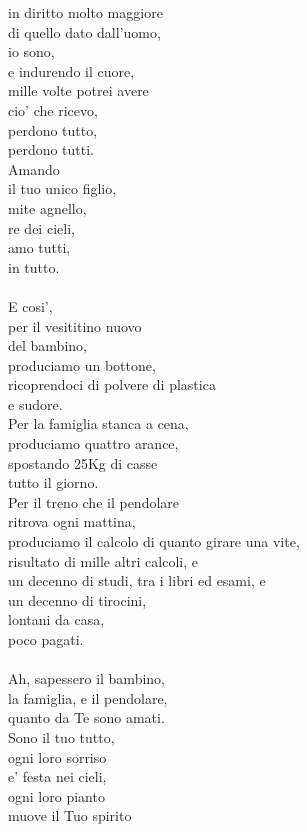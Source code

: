 \begin{haiku}
in diritto molto maggiore\\
di quello dato dall'uomo,\\
io sono,\\
e indurendo il cuore,\\
mille volte potrei avere\\
cio' che ricevo,\\
perdono tutto,\\
perdono tutti.\\
Amando \\
il tuo unico figlio,\\
mite agnello,\\
re dei cieli,\\
amo tutti,\\
in tutto.\\
\leavevmode\\
E cosi',\\
per il vesititino nuovo\\
del bambino,\\
produciamo un bottone,\\
ricoprendoci di polvere di plastica\\
e sudore.\\
Per la famiglia stanca a cena,\\
produciamo quattro arance,\\
spostando 25Kg di casse\\
tutto il giorno.\\
Per il treno che il pendolare \\
ritrova ogni mattina,\\
produciamo il calcolo di quanto girare una vite,\\
risultato di mille altri calcoli, e\\
un decenno di studi, tra i libri ed esami, e\\
un decenno di tirocini,\\
lontani da casa,\\
poco pagati.\\
\leavevmode\\
Ah, sapessero il bambino,\\
la famiglia, e il pendolare,\\
quanto da Te sono amati.\\
Sono il tuo tutto,\\
ogni loro sorriso\\
e' festa nei cieli,\\
ogni loro pianto\\
muove il Tuo spirito\\

\end{haiku}
